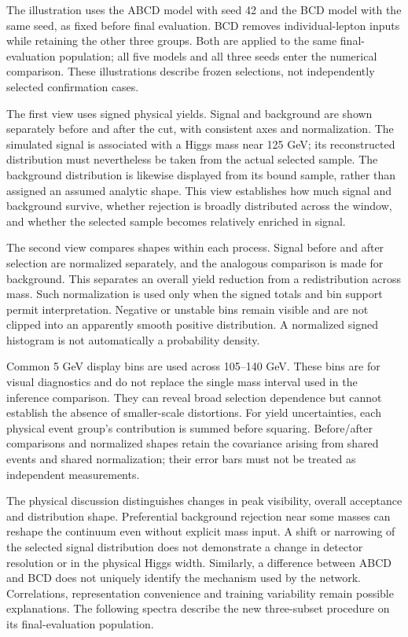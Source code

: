 \documentclass[aps,prd,reprint,superscriptaddress,nofootinbib,longbibliography,floatfix]{revtex4-2}
\begin{document}
The illustration uses the ABCD model with seed 42 and the BCD model with the same
seed, as fixed before final evaluation. BCD removes individual-lepton inputs while
retaining the other three groups. Both are applied to the same final-evaluation
population; all five models and all three seeds enter the numerical comparison.
These illustrations describe frozen selections, not independently selected
confirmation cases.

The first view uses signed physical yields. Signal and background are shown separately
before and after the cut, with consistent axes and normalization. The simulated signal is
associated with a Higgs mass near 125 GeV; its reconstructed distribution must nevertheless
be taken from the actual selected sample. The background distribution is likewise displayed
from its bound sample, rather than assigned an assumed analytic shape. This view establishes
how much signal and background survive, whether rejection is broadly distributed across the
window, and whether the selected sample becomes relatively enriched in signal.

The second view compares shapes within each process. Signal before and after selection are
normalized separately, and the analogous comparison is made for background. This separates
an overall yield reduction from a redistribution across mass. Such normalization is used
only when the signed totals and bin support permit interpretation. Negative or unstable bins
remain visible and are not clipped into an apparently smooth positive distribution. A
normalized signed histogram is not automatically a probability density.

Common 5 GeV display bins are used across 105--140 GeV. These bins are for visual
diagnostics and do not replace the single mass interval used in the inference comparison.
They can reveal broad selection dependence but cannot establish the absence of smaller-scale
distortions. For yield uncertainties, each physical event group's contribution is summed
before squaring. Before/after comparisons and normalized shapes retain the covariance
arising from shared events and shared normalization; their error bars must not be treated as
independent measurements.

The physical discussion distinguishes changes in peak visibility, overall acceptance and
distribution shape. Preferential background rejection near some masses can reshape the
continuum even without explicit mass input. A shift or narrowing of the selected signal
distribution does not demonstrate a change in detector resolution or in the physical Higgs
width. Similarly, a difference between ABCD and BCD does not uniquely identify the mechanism
used by the network. Correlations, representation convenience and training variability
remain possible explanations. The following spectra describe the new
three-subset procedure on its final-evaluation population.
\end{document}
